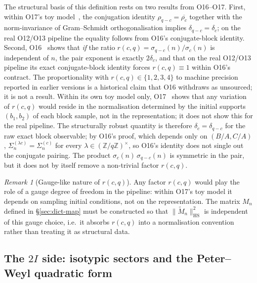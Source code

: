 \documentclass[12pt,a4paper]{article}
\theoremstyle{definition}
\theoremstyle{remark}
\newtheorem{remark}[theorem]{Remark}
\begin{document}
    The structural basis of this definition rests on two results from O16--O17.
    First, within O17's toy model~\cite{Beau2026a21}, the conjugation identity
    $\rho_{q-c} = \overline{\rho_c}$ together with the norm-invariance of Gram--Schmidt
    orthogonalisation implies $\delta_{q-c} = \delta_c$; on the real O12/O13 pipeline the equality
    follows from O16's conjugate-block identity.
    Second, O16~\cite{Beau2026a20} shows that \emph{if} the ratio
    $r(c,q) = \sigma_{q-c}(n)/\sigma_c(n)$ is independent of $n$, the pair exponent is exactly
    $2\delta_c$, and that on the real O12/O13 pipeline its exact conjugate-block identity
    forces $r(c,q) \equiv 1$ within O16's contract.
    The proportionality with $r(c,q) \in \{1,2,3,4\}$ to machine precision reported in earlier
    versions is a historical claim that O16 withdraws as unsourced; it is not a result.
    Within its own toy model only, O17~\cite{Beau2026a21} shows that any variation of $r(c,q)$
    would reside in the normalisation determined by the initial supports $(b_1, b_2)$ of each
    block sample, not in the representation; it does not show this for the real pipeline.
    The structurally robust quantity is therefore $\delta_c = \delta_{q-c}$ for the raw exact block
    observable; by O16's proof, which depends only on $(B/A, C/A)$, $\Sigma_n^{(\lambda c)} = \Sigma_n^{(c)}$ for every $\lambda \in (\mathbb{Z}/q\mathbb{Z})^{\times}$, so O16's identity does not single out the conjugate pairing.
    The product $\sigma_c(n)\,\sigma_{q-c}(n)$ is symmetric in the pair, but it does not by
    itself remove a non-trivial factor $r(c,q)$.

    \begin{remark}[Gauge-like nature of $r(c,q)$]
  Any factor $r(c,q)$ would play the role of a gauge degree of freedom in the pipeline:
  within O17's toy model it depends on sampling initial conditions, not on the representation.
  The matrix $M_n$ defined in §\ref{sec:dict-map} must be constructed so that
  $\|\widetilde{M}_n\|_{\mathrm{HS}}^2$ is independent of this gauge choice,
  i.e.\ it absorbs $r(c,q)$ into a normalisation convention rather than treating
  it as structural data.
    \end{remark}

  \subsection{The $2I$ side: isotypic sectors and the Peter--Weyl quadratic form}
    \label{sec:dict-2I}
\end{document}
